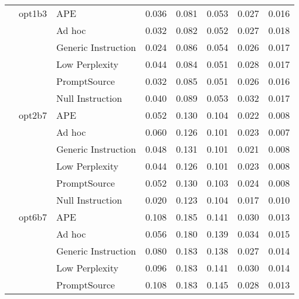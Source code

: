 \begin{supertabular}{lllrrrrr}
              & opt1b3 & APE &            0.036 &           0.081 &          0.053 &        0.027 &    0.016 \\
              &        & Ad hoc &            0.032 &           0.082 &          0.052 &        0.027 &    0.018 \\
              &        & Generic Instruction &            0.024 &           0.086 &          0.054 &        0.026 &    0.017 \\
              &        & Low Perplexity &            0.044 &           0.084 &          0.051 &        0.028 &    0.017 \\
              &        & PromptSource &            0.032 &           0.085 &          0.051 &        0.026 &    0.016 \\
              &        & Null Instruction &            0.040 &           0.089 &          0.053 &        0.032 &    0.017 \\
              & opt2b7 & APE &            0.052 &           0.130 &          0.104 &        0.022 &    0.008 \\
              &        & Ad hoc &            0.060 &           0.126 &          0.101 &        0.023 &    0.007 \\
              &        & Generic Instruction &            0.048 &           0.131 &          0.101 &        0.021 &    0.008 \\
              &        & Low Perplexity &            0.044 &           0.126 &          0.101 &        0.023 &    0.008 \\
              &        & PromptSource &            0.052 &           0.130 &          0.103 &        0.024 &    0.008 \\
              &        & Null Instruction &            0.020 &           0.123 &          0.104 &        0.017 &    0.010 \\
              & opt6b7 & APE &            0.108 &           0.185 &          0.141 &        0.030 &    0.013 \\
              &        & Ad hoc &            0.056 &           0.180 &          0.139 &        0.034 &    0.015 \\
              &        & Generic Instruction &            0.080 &           0.183 &          0.138 &        0.027 &    0.014 \\
              &        & Low Perplexity &            0.096 &           0.183 &          0.141 &        0.030 &    0.014 \\
              &        & PromptSource &            0.108 &           0.183 &          0.145 &        0.028 &    0.013 \\

\end{supertabular}
